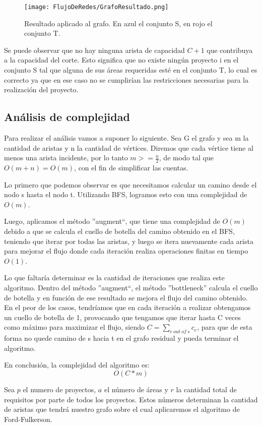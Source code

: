 \begin{figure}[H]
\centering
\texttt{[image: FlujoDeRedes/GrafoResultado.png]}
\caption{Resultado aplicado al grafo. En azul el conjunto S, en rojo el conjunto T.}
\end{figure}

Se puede observar que no hay ninguna arista de capacidad $C+1$ que contribuya a la capacidad del corte. Esto significa que no existe ningún proyecto i en el conjunto S tal que alguna de sus áreas requeridas 
esté en el conjunto T, lo cual es correcto ya que en ese caso no se cumplirían las restricciones necesarias para la realización del proyecto.


\subsection{Análisis de complejidad}

Para realizar el análisis vamos a suponer lo siguiente. Sea G el grafo y sea m la cantidad de aristas y n la cantidad de vértices. Diremos que cada vértice tiene al menos una arista incidente, 
por lo tanto $m >= \frac{n}{2}$, de modo tal que $O(m + n) = O(m)$, con el fin de simplificar las cuentas.

Lo primero que podemos observar es que necesitamos calcular un camino desde el nodo s hasta el nodo t. Utilizando BFS, logramos esto con una complejidad de $O(m)$.

Luego, aplicamos el método ''augment``, que tiene una complejidad de $O(m)$ debido a que se calcula el cuello de botella del camino obtenido en el BFS, 
teniendo que iterar por todas las aristas, y luego se itera 
nuevamente cada arista para mejorar el flujo donde cada iteración realiza operaciones finitas 
en tiempo $O(1)$.

Lo que faltaría determinar es la cantidad de iteraciones que realiza este algoritmo.
Dentro del método ''augment``, el método ''bottleneck'' calcula el cuello de botella y en función de ese resultado se mejora el flujo del camino obtenido. En el peor de los casos, tendríamos que en cada 
iteración a realizar obtengamos un cuello de botella de 1, provocando que tengamos que iterar hasta C veces como máximo para maximizar el flujo, siendo $ C = \sum\limits_{e\ out\ of\ s} c_e$, 
para que de esta forma no quede camino de s hacia t en el grafo residual y pueda terminar el algoritmo.

En conclusión, la complejidad del algoritmo es:
$$ O(C * m) $$

Sea $p$ el numero de proyectos, $a$ el número de áreas y $r$ la cantidad total de requisitos por parte de todos los proyectos.
Estos números determinan la cantidad de aristas que tendrá nuestro grafo sobre el cual aplicaremos el algoritmo de Ford-Fulkerson.

